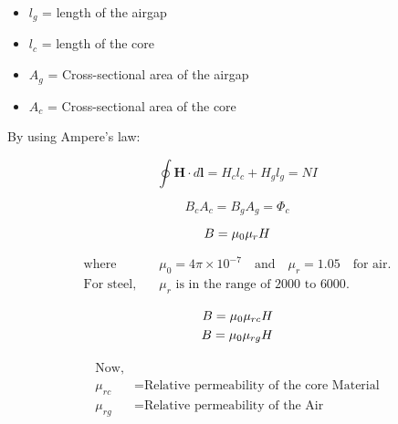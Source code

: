 \documentclass{article}
\begin{document}
\huge
\begin{itemize}
    \item \( l_g \) = length of the airgap
    \item \( l_c \) = length of the core
    \item \( A_g \) = Cross-sectional area of the airgap
    \item \( A_c \) = Cross-sectional area of the core
\end{itemize}

By using Ampere's law:

\begin{equation}
    \oint \mathbf{H} \cdot d\mathbf{l} = H_c l_c + H_g l_g = NI \tag{1}
\end{equation}





\begin{equation}
    B_c A_c = B_g A_g = \Phi_c \tag{2}
\end{equation}

\vspace{0.5cm} %
\begin{equation*}
   \Huge  {B} = \mu_0 \mu_r {H}
\end{equation*}

\begin{align*}
\text{where} \quad & \mu_0 = 4 \pi \times 10^{-7} \quad \text{and} \quad \mu_r = 1.05 \quad \text{for air}. \\
\text{For steel,} \quad & \mu_r \text{ is in the range of } 2000 \text{ to } 6000.
\end{align*}

\vspace{0.5cm} %
\begin{equation*}
\begin{split}
   \Huge  {B} = \mu_0 \mu_{rc} {H}\\
  \Huge  {B} = \mu_0 \mu_{rg} {H}
\end{split}
\end{equation*}




\begin{equation*}
\begin{split}
\begin{aligned}
\text{Now,} \\
\mu_{rc} &= \text{Relative permeability of the core Material}\\
\mu_{rg} &= \text{Relative permeability of the Air}
\end{aligned}
\end{split}
\end{equation*}
\end{document}
